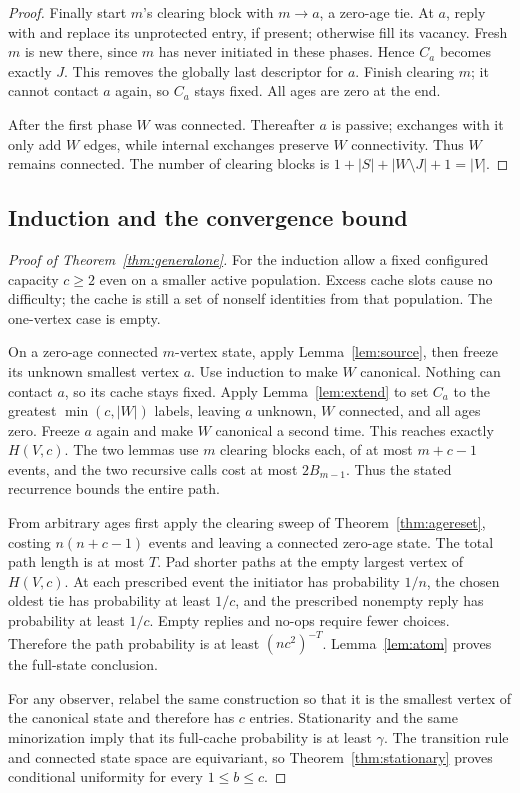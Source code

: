 \documentclass[11pt]{article}
\begin{document}
\begin{proof}
Finally start $m$'s clearing block with $m\to a$, a zero-age tie.
At $a$, reply with and replace its unprotected entry, if present;
otherwise fill its vacancy. Fresh $m$ is new there, since $m$
has never initiated in these phases. Hence $C_a$ becomes
exactly $J$. This removes the globally last descriptor for $a$.
Finish clearing $m$; it cannot contact $a$ again, so $C_a$ stays
fixed. All ages are zero at the end.

After the first phase $W$ was connected. Thereafter $a$ is
passive; exchanges with it only add $W$ edges, while internal
exchanges preserve $W$ connectivity. Thus $W$ remains connected.
The number of clearing blocks is
$1+|S|+|W\setminus J|+1=|V|$.
\end{proof}

\subsection{Induction and the convergence bound}

\begin{proof}[Proof of Theorem~\ref{thm:generalone}]
For the induction allow a fixed configured capacity $c\ge2$
even on a smaller active population. Excess cache slots cause
no difficulty; the cache is still a set of nonself identities
from that population. The one-vertex case is empty.

On a zero-age connected $m$-vertex state, apply
Lemma~\ref{lem:source}, then freeze its unknown smallest vertex
$a$. Use induction to make $W$ canonical. Nothing can contact
$a$, so its cache stays fixed. Apply Lemma~\ref{lem:extend} to
set $C_a$ to the greatest $\min(c,|W|)$ labels, leaving $a$
unknown, $W$ connected, and all ages zero.
Freeze $a$ again and make $W$ canonical a second time.
This reaches exactly $H(V,c)$.
The two lemmas use $m$ clearing blocks each, of at most
$m+c-1$ events, and the two recursive calls cost at most
$2B_{m-1}$. Thus the stated recurrence bounds the entire path.

From arbitrary ages first apply the clearing sweep of
Theorem~\ref{thm:agereset}, costing $n(n+c-1)$ events and
leaving a connected zero-age state. The total path length is
at most $T$. Pad shorter paths at the empty largest vertex of
$H(V,c)$. At each prescribed event the initiator has probability
$1/n$, the chosen oldest tie has probability at least $1/c$,
and the prescribed nonempty reply has probability at least $1/c$.
Empty replies and no-ops require fewer choices.
Therefore the path probability is at least $(nc^2)^{-T}$.
Lemma~\ref{lem:atom} proves the full-state conclusion.

For any observer, relabel the same construction so that it is
the smallest vertex of the canonical state and therefore has
$c$ entries. Stationarity and the same minorization imply that
its full-cache probability is at least $\gamma$.
The transition rule and connected state space are equivariant,
so Theorem~\ref{thm:stationary} proves conditional uniformity
for every $1\le b\le c$.
\end{proof}
\end{document}
